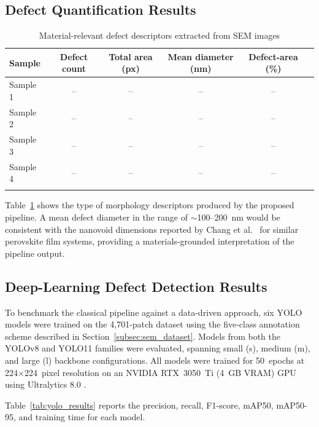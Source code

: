 \documentclass[pdflatex,sn-mathphys-num,iicol]{sn-jnl}
\theoremstyle{thmstyleone}
\theoremstyle{thmstyletwo}
\theoremstyle{thmstylethree}
\begin{document}
\subsection{Defect Quantification Results}
\label{subsec:defect_quantification_results}

\begin{table}[h]
\caption{Material-relevant defect descriptors extracted from SEM images}
\label{tab:defect_descriptors}
\begin{tabular}{@{}lccccc@{}}
\toprule
Sample & Defect count & Total area (px) & Mean diameter (nm) & Defect-area (\%) \\
\midrule
Sample 1 & -- & -- & -- & -- \\
Sample 2 & -- & -- & -- & -- \\
Sample 3 & -- & -- & -- & -- \\
Sample 4 & -- & -- & -- & -- \\
\botrule
\end{tabular}
\end{table}

Table~\ref{tab:defect_descriptors} shows the type of morphology
descriptors produced by the proposed pipeline. A mean defect diameter
in the range of $\sim$100--200~nm would be consistent with the
nanovoid dimensions reported by Chang et al.\ \cite{chang2026} for
similar perovskite film systems, providing a materials-grounded
interpretation of the pipeline output.

\subsection{Deep-Learning Defect Detection Results}
\label{subsec:yolo_results}

To benchmark the classical pipeline against a data-driven approach,
six YOLO models were trained on the 4{,}701-patch dataset using
the five-class annotation scheme described in
Section~\ref{subsec:sem_dataset}. Models from both the YOLOv8 and
YOLO11 families were evaluated, spanning small (s), medium (m), and
large (l) backbone configurations. All models were trained for
50~epochs at 224$\times$224~pixel resolution on an NVIDIA RTX~3050~Ti
(4~GB VRAM) GPU using Ultralytics 8.0 \cite{ultralytics2023}.

Table~\ref{tab:yolo_results} reports the precision, recall,
F1-score, mAP50, mAP50-95, and training time for each model.
\end{document}
